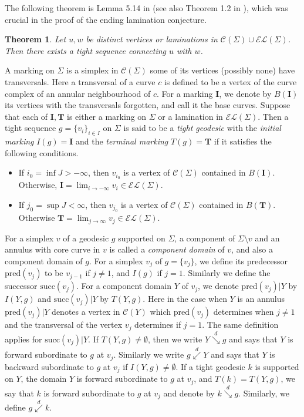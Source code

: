 \documentclass{amsart}
\newtheorem{theorem}{Theorem}[section]
\theoremstyle{definition}
\numberwithin{figure}{section}
\numberwithin{equation}{section}
\newcommand{\blackboard}[1]{\ensuremath{\mathbb{#1}}}
\newcommand{\complexes}{\blackboard{C}}
\newcommand{\pre}{\mathrm{pred}}
\newcommand{\suc}{\mathrm{succ}}
\newcommand{\subord}{\overset{d}{\searrow}}
\newcommand{\supord}{\overset{d}{\swarrow}}
\def\cc{\complexes}
\def\cc{\mathcal{C}}
\def\sto{\rightarrow}
\begin{document}
The following theorem is Lemma 5.14 in \cite{mi2} (see also Theorem 1.2 in \cite{bow2}), which was crucial in the proof of the ending lamination conjecture.

\begin{theorem}\label{tight}
Let $u,w$ be distinct vertices or laminations in $\cc(\Sigma)\cup \mathcal{EL}(\Sigma)$.
Then there exists a tight sequence connecting 
$u$ with $w$.
\end{theorem}

A marking on $\Sigma$ is a simplex in $\cc(\Sigma)$ some of its vertices (possibly none) have transversals.
Here a transversal of a curve $c$ is defined to be a vertex of the curve complex of an annular neighbourhood of $c$.
For a marking $\boldsymbol I$, we denote by $B(\boldsymbol I)$ its  vertices with the transversals forgotten, and call it the base curves.
Suppose that each of $\boldsymbol{I},\boldsymbol{T}$ is either a marking on $\Sigma$   or a lamination in 
$\mathcal{EL}(\Sigma)$.
Then a tight sequence $g=\{v_i\}_{i\in I}$ on $\Sigma$ is said to be a \emph{tight geodesic} with the 
\emph{initial marking} $I(g)=\boldsymbol{I}$ and the \emph{terminal marking} $T(g)=
\boldsymbol{T}$ if it satisfies the following conditions.
\begin{itemize}
\item
If $i_0=\inf J>-\infty$, then $v_{i_0}$ is a vertex of $\cc(\Sigma)$ contained in $B(\boldsymbol{I})$. 
Otherwise, $\boldsymbol{I}=\lim_{i\sto-\infty}v_i\in \mathcal{EL}(\Sigma)$.
\item
If $j_0=\sup J<\infty$, then $v_{j_0}$ is a vertex of $\cc(\Sigma)$ contained in $B(\boldsymbol{T})$. 
Otherwise $\boldsymbol{T} =\lim_{j\sto \infty}v_j\in \mathcal{EL}(\Sigma)$.
\end{itemize}

For a simplex $v$ of a geodesic $g$ supported on $\Sigma$, a component of $\Sigma \setminus v$ and an annulus with core curve in $v$  is called a {\em component domain} of $v$, and also a component domain of $g$.
For a simplex $v_j$ of $g=\{v_j\}$, we define its predecessor $\mathrm{pred} (v_j)$ to be $v_{j-1}$ if $j\neq 1$, and $I(g)$ if $j=1$.
Similarly we define the successor $\suc(v_j)$.
For a component domain $Y$ of $v_j$, we denote $\pre(v_j)|Y$ by $I(Y,g)$ and $\suc(v_j)|Y$ by $T(Y,g)$.
Here in the case when $Y$ is an annulus $\pre(v_j)|Y$ denotes a vertex in $\cc(Y)$ which $\pre(v_j)$ determines when $j\neq 1$ and the transversal of the vertex $v_j$ determines if $j=1$.
The same definition applies for $\suc(v_j)|Y$.
If $T(Y,g)\neq \emptyset$, then we write $Y \subord g$ and says that $Y$ is forward subordinate to $g$ at $v_j$.
Similarly we write $g \supord Y$ and says that $Y$ is backward subordinate to $g$ at $v_j$ if $I(Y,g)\neq \emptyset$.
If a tight geodesic $k$ is supported on $Y$, the domain $Y$ is forward subordinate to $g$ at $v_j$, and $T(k)=T(Y,g)$, we say that $k$ is forward subordinate to $g$ at $v_j$ and denote by $k \subord g$.
Similarly, we define $g \supord k$.
\end{document}
